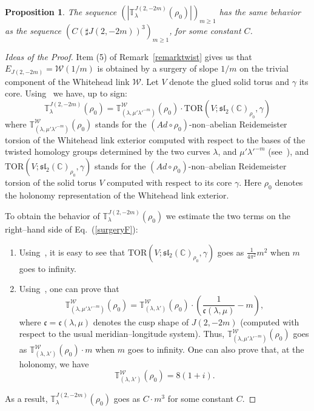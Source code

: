 \documentclass[a4paper]{amsart}
\theoremstyle{plain}
\newtheorem{proposition}[theorem]{Proposition}%
\theoremstyle{definition}
\theoremstyle{remark}
\newcommand{\CC}{{\mathbb C}}
\newcommand{\cusp}{{\mathfrak{c}}}
\newcommand{\sll}{\mathfrak{sl}_2(\CC)}
\begin{document}
\begin{proposition}
The sequence $\left( {|{\mathbb T}^{J(2, -2m)}_{\lambda}(\rho_0)|} \right)_{m\geqslant 1}$ has the same behavior as the sequence $\left( {C (\sharp J(2, -2m))^3} \right)_{m\geqslant 1}$, for some constant $C$. 
\end{proposition}
\begin{proof}[Ideas of the Proof]
Item (5) of Remark~\ref{remarktwist} gives us that $E_{J(2, -2m)} = \mathcal{W}(1/m)$ is obtained by a surgery of slope $1/m$ on the trivial component of the Whitehead link $\mathcal{W}$. Let $V$ denote the glued solid torus and $\gamma$ its core. Using~\cite[Theorem 4.1 (iii) and Proposition 2.25]{Porti:1997} we have, up to sign:
\begin{equation}\label{surgeryF}
{\mathbb T}^{J(2, -2m)}_{\lambda}(\rho_0) = {\mathbb T}^{\mathcal{W}}_{(\lambda, \mu' {\lambda'}^{-m})}(\rho_0) \cdot \mathrm{TOR}(V; \sll_{\rho_0}, \gamma)
\end{equation}
where ${\mathbb T}^{\mathcal{W}}_{(\lambda, \mu' {\lambda'}^{-m})}(\rho_0)$ stands for the $(Ad \circ \rho_0)$-non--abelian Reidemeister torsion of the Whitehead link exterior computed with respect to the bases of the twisted homology groups determined by the two curves $\lambda$, and $\mu' {\lambda'}^{-m}$ (see~\cite[Theorem 4.1]{Porti:1997}), and $\mathrm{TOR}(V; \sll_{\rho_0}, \gamma)$ stands for the $(Ad \circ \rho_0)$-non--abelian Reidemeister torsion of the solid torus $V$ computed with respect to its core $\gamma$. Here $\rho_0$ denotes the holonomy representation of the Whitehead link exterior.

To obtain the behavior of ${\mathbb T}^{J(2, -2m)}_{\lambda}(\rho_0)$ we estimate the two terms on the right--hand side of Eq.~(\ref{surgeryF}):
\begin{enumerate}
  \item Using~\cite[Proof of Theorem 4.17]{Porti:1997}, it is easy to see that $\mathrm{TOR}(V; \sll_{\rho_0}, \gamma)$ goes as $\frac{1}{4 \pi^2} m^2$ when $m$ goes to infinity.
  \item Using~\cite[Theorem 4.1 (ii)]{Porti:1997}, one can prove that 
  \[
  {\mathbb T}^{\mathcal{W}}_{(\lambda, \mu' {\lambda'}^{-m})}(\rho_0) = {\mathbb T}^{\mathcal{W}}_{(\lambda, \lambda')}(\rho_0) \cdot \left( \frac{1}{\cusp(\lambda, \mu)} - m\right),
  \] 
  where $\cusp = \cusp(\lambda, \mu)$ denotes the cusp shape of $J(2, -2m)$ (computed with respect to the usual meridian--longitude system). Thus, ${\mathbb T}^{\mathcal{W}}_{(\lambda, \mu' {\lambda'}^{-m})}(\rho_0)$ goes as $ {\mathbb T}^{\mathcal{W}}_{(\lambda, \lambda')}(\rho_0) \cdot m$ when $m$ goes to infinity. One can also prove that, at the holonomy, we have 
  \[
  {\mathbb T}^{\mathcal{W}}_{(\lambda, \lambda')}(\rho_0)  = 8(1+i).
  \]
\end{enumerate}
As a result, ${\mathbb T}^{J(2, -2m)}_{\lambda}(\rho_0)$ goes as $C\cdot m^3$ for some constant $C$.
\end{proof}
\end{document}
